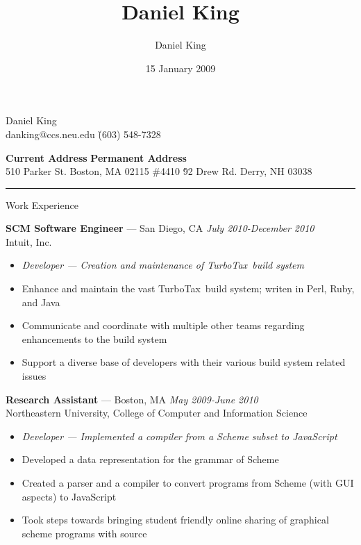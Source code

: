 \documentclass[10pt]{letter}
\author{Daniel King}
\title{Daniel King}
\date{15 January 2009}
\begin{document}
\begin{tabbing}{\Huge Daniel King} \\
\normalsize danking@ccs.neu.edu \`(603) 548-7328
\end{tabbing}

\vspace{-10pt}
\begin{tabbing}
\textbf{Current Address} \`\textbf{Permanent Address}\\
510 Parker St. Boston, MA 02115 \#4410 \`92 Drew Rd. Derry, NH 03038
\end{tabbing}\vspace{-15pt}
\rule{\linewidth}{.5pt}

{\Large Work Experience}
\begin{tabbing}
{\large \bf SCM Software Engineer} --- San Diego, CA \` \textit{July 2010-December 2010} \\
Intuit, Inc.

\end{tabbing}\vspace{-10pt}

\begin{itemize}
\setlength\itemsep{1pt}
\item [] \textit{Developer --- Creation and maintenance of TurboTax\textregistered~build system}
\item Enhance and maintain the vast TurboTax\textregistered~build system; writen in Perl, Ruby, and Java
\item Communicate and coordinate with multiple other teams regarding enhancements to the build system
\item Support a diverse base of developers with their various build system related issues
\end{itemize}

\begin{tabbing}
{\large \bf Research Assistant} --- Boston, MA \` \textit{May 2009-June 2010} \\
Northeastern University, College of Computer and Information Science
\end{tabbing}\vspace{-10pt}
\begin{itemize}
\setlength\itemsep{1pt}
\item [] \textit{Developer --- Implemented a compiler from a Scheme subset to JavaScript}
\item Developed a data representation for the grammar of Scheme
\item Created a parser and a compiler to convert programs from Scheme (with GUI aspects) to JavaScript
\item Took steps towards bringing student friendly online sharing of graphical scheme programs with source
\end{itemize}
\end{document}
